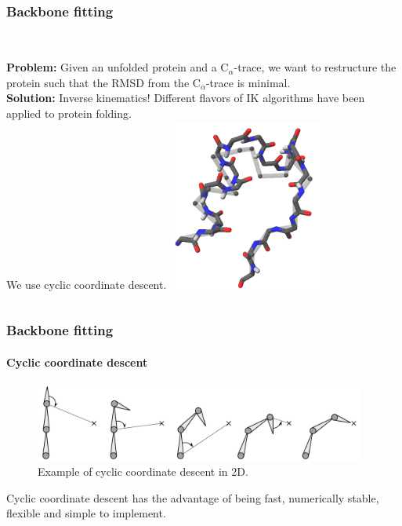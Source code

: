 \documentclass{beamer}
\begin{document}
\subsection*{}
\begin{frame}[t, fragile]
  \frametitle{Backbone fitting} 
\begin{columns}[c]
\column{2.3in}
\\\vspace*{4mm}
\textbf{Problem:} Given an unfolded protein and a C$_\alpha$-trace, we want to restructure the protein such that the RMSD from the C$_\alpha$-trace is minimal.
\\\vspace*{4mm}
\textbf{Solution:} Inverse kinematics! Different flavors of IK algorithms have been applied to protein folding.
\\\vspace*{8mm}
We use cyclic coordinate descent.
\column{2in}
	\vspace*{4mm}
	\includegraphics[width=2in]{../rapport/figures/forside.png}
\end{columns}
\end{frame}

\begin{frame}[t, fragile]
\frametitle{Backbone fitting} 
\framesubtitle{Cyclic coordinate descent}
\begin{figure}
	\centering
	\includegraphics[width=4.3in]{ccd2d}
	\caption{Example of cyclic coordinate descent in 2D.}
\end{figure}
\vspace*{2mm}
Cyclic coordinate descent has the advantage of being fast, numerically stable, flexible and simple to implement.
\end{frame}
\end{document}
